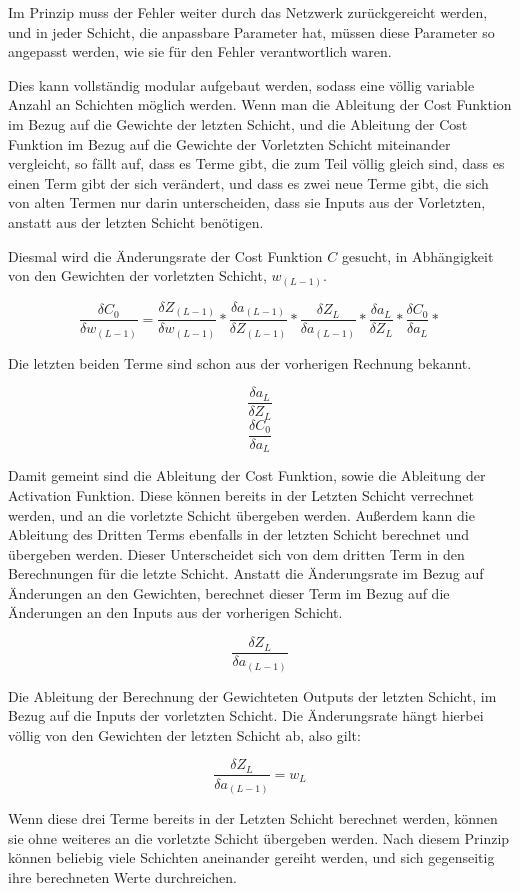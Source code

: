 \documentclass[12pt]{article}
\begin{document}
Im Prinzip muss der Fehler weiter durch das Netzwerk zurückgereicht werden, und in jeder Schicht, die anpassbare Parameter hat, müssen diese Parameter so angepasst werden, wie sie für den Fehler verantwortlich waren.

Dies kann vollständig modular aufgebaut werden, sodass eine völlig variable Anzahl an Schichten möglich werden. Wenn man die Ableitung der Cost Funktion im Bezug auf die Gewichte der letzten Schicht, und die Ableitung der Cost Funktion im Bezug auf die Gewichte der Vorletzten Schicht miteinander vergleicht, so fällt auf, dass es Terme gibt, die zum Teil völlig gleich sind, dass es einen Term gibt der sich verändert, und dass es zwei neue Terme gibt, die sich von alten Termen nur darin unterscheiden, dass sie Inputs aus der Vorletzten, anstatt aus der letzten Schicht benötigen.

Diesmal wird die Änderungsrate der Cost Funktion $C$ gesucht, in Abhängigkeit von den Gewichten der vorletzten Schicht, $w_{(L-1)}$.

$$\frac{\delta C_0}{\delta w_{(L-1)}}=
\frac{\delta Z_{(L-1)}}{\delta w_{(L-1)}}*
\frac{\delta a_{(L-1)}}{\delta Z_{(L-1)}}*
\frac{\delta Z_L}{\delta a_{(L-1)}}*
\frac{\delta a_L}{\delta Z_L}*
\frac{\delta C_0}{\delta a_L}*
$$

Die letzten beiden Terme sind schon aus der vorherigen Rechnung bekannt.

$$\frac{\delta a_L}{\delta Z_L}$$
$$\frac{\delta C_0}{\delta a_L}$$

Damit gemeint sind die Ableitung der Cost Funktion, sowie die Ableitung der Activation Funktion. Diese können bereits in der Letzten Schicht verrechnet werden, und an die vorletzte Schicht übergeben werden. Außerdem kann die Ableitung des Dritten Terms ebenfalls in der letzten Schicht berechnet und übergeben werden. Dieser Unterscheidet sich von dem dritten Term in den Berechnungen für die letzte Schicht. Anstatt die Änderungsrate im Bezug auf Änderungen an den Gewichten, berechnet dieser Term im Bezug auf die Änderungen an den Inputs aus der vorherigen Schicht.

$$\frac{\delta Z_L}{\delta a_{(L-1)}}$$

Die Ableitung der Berechnung der Gewichteten Outputs der letzten Schicht, im Bezug auf die Inputs der vorletzten Schicht. Die Änderungsrate hängt hierbei völlig von den Gewichten der letzten Schicht ab, also gilt:

$$\frac{\delta Z_L}{\delta a_{(L-1)}} = w_L$$

Wenn diese drei Terme bereits in der Letzten Schicht berechnet werden, können sie ohne weiteres an die vorletzte Schicht übergeben werden. Nach diesem Prinzip können beliebig viele Schichten aneinander gereiht werden, und sich gegenseitig ihre berechneten Werte durchreichen. 
\end{document}
